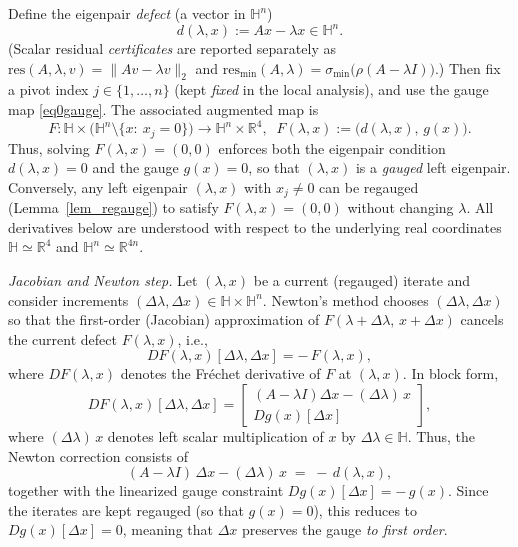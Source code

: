\documentclass[preprint,12pt]{elsarticle}  %
\theoremstyle{definition}
\theoremstyle{definition}
\theoremstyle{definition}
\theoremstyle{definition}
\theoremstyle{definition}
\theoremstyle{remark}
\theoremstyle{remark}
\theoremstyle{remark}
\newcommand{\RR}{\mathbb{R}}
\newcommand{\HH}{\mathbb{H}}
\begin{document}
Define the eigenpair \emph{defect} (a vector in $\HH^n$)
\[
d(\lambda,x):=Ax-\lambda x\in\HH^n.
\]
(Scalar residual \emph{certificates} are reported separately as $\mathrm{res}(A,\lambda,v)=\|Av-\lambda v\|_2$ and
$\mathrm{res}_{\min}(A,\lambda)=\sigma_{\min}\!\bigl(\rho(A-\lambda I)\bigr)$.)
Then fix a pivot index $j\in\{1,\dots,n\}$ (kept \emph{fixed} in the local analysis), and use the gauge map \eqref{eq0gauge}.
The associated augmented map is
\begin{equation}
\label{eq_Fdef}
F:\HH\times\bigl(\HH^n\setminus\{x:\ x_j=0\}\bigr)\to \HH^n\times\RR^4,
\;\;
F(\lambda,x):=\bigl(d(\lambda,x),\,g(x)\bigr).
\end{equation}
Thus, solving $F(\lambda,x)=(0,0)$ enforces both the eigenpair condition $d(\lambda,x)=0$ and the gauge $g(x)=0$,
so that $(\lambda,x)$ is a \emph{gauged} left eigenpair.
Conversely, any left eigenpair $(\lambda,x)$ with $x_j\neq0$ can be regauged (Lemma~\ref{lem_regauge})
to satisfy $F(\lambda,x)=(0,0)$ without changing $\lambda$.
All derivatives below are understood with respect to the underlying real coordinates
$\HH\simeq\RR^4$ and $\HH^n\simeq\RR^{4n}$.

\noindent\emph{Jacobian and Newton step.}
Let $(\lambda,x)$ be a current (regauged) iterate and consider increments
$(\Delta\lambda,\Delta x)\in\HH\times\HH^n$.
Newton's method chooses $(\Delta\lambda,\Delta x)$ so that the first-order (Jacobian) approximation of
$F(\lambda+\Delta\lambda,\,x+\Delta x)$ cancels the current defect $F(\lambda,x)$, i.e.,
\begin{equation}
\label{eq_newton_linearization}
DF(\lambda,x)[\Delta\lambda,\Delta x]= -\,F(\lambda,x),
\end{equation}
where $DF(\lambda,x)$ denotes the Fr\'echet derivative of $F$ at $(\lambda,x)$.
In block form,
\[
DF(\lambda,x)[\Delta\lambda,\Delta x]
=
\begin{bmatrix}
(A-\lambda I)\Delta x-(\Delta\lambda)\,x\\[0.5mm]
Dg(x)[\Delta x]
\end{bmatrix},
\]
where $(\Delta\lambda)\,x$ denotes left scalar multiplication of $x$ by $\Delta\lambda\in\HH$.
Thus, the Newton correction consists of
\begin{equation}
\label{eq_newton_core}
(A-\lambda I)\,\Delta x-(\Delta\lambda)\,x \;=\; -\,d(\lambda,x),
\end{equation}
together with the linearized gauge constraint $Dg(x)[\Delta x]= -\,g(x)$.
Since the iterates are kept regauged (so that $g(x)=0$), this reduces to $Dg(x)[\Delta x]=0$,
meaning that $\Delta x$ preserves the gauge \emph{to first order}.
\end{document}
